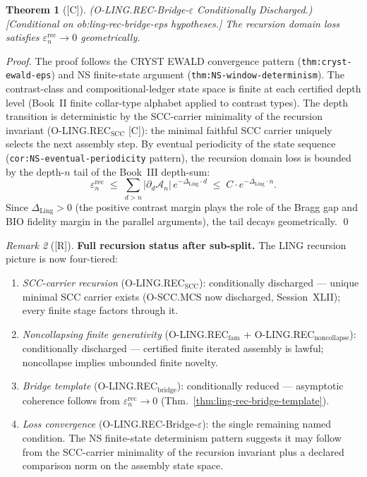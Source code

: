 \documentclass[12pt,oneside]{amsbook}
\theoremstyle{plain}
\newtheorem{theorem}{Theorem}[section]
\theoremstyle{definition}
\theoremstyle{remark}
\newtheorem{remark}[theorem]{Remark}
\newcommand{\status}[1]{\textup{[#1]}}
\begin{document}
\begin{theorem}[\status{C}]\label{thm:ling-rec-bridge-eps-discharged}
\textup{(O-LING.REC-Bridge-$\varepsilon$ Conditionally Discharged.)}
\textup{[Conditional on ob:ling-rec-bridge-eps hypotheses.]}
The recursion domain loss satisfies
$\varepsilon_n^{\mathrm{rec}} \to 0$ geometrically.
\end{theorem}

\begin{proof}
The proof follows the CRYST EWALD convergence pattern
(\texttt{thm:cryst-ewald-eps}) and NS finite-state argument
(\texttt{thm:NS-window-determinism}).
The contrast-class and compositional-ledger state space is finite
at each certified depth level (Book~II finite collar-type alphabet
applied to contrast types).  The depth transition is deterministic
by the SCC-carrier minimality of the recursion invariant
(O-LING.REC$_{\mathrm{SCC}}$ [C]): the minimal faithful SCC
carrier uniquely selects the next assembly step.  By eventual
periodicity of the state sequence (\texttt{cor:NS-eventual-periodicity}
pattern), the recursion domain loss is bounded by the depth-$n$
tail of the Book~III depth-sum:
\[
  \varepsilon_n^{\mathrm{rec}}
  \;\le\;
  \sum_{d > n} |\partial_d \mathcal{A}_n|\,
  e^{-\Delta_{\mathrm{Ling}} \cdot d}
  \;\le\;
  C \cdot e^{-\Delta_{\mathrm{Ling}} \cdot n}.
\]
Since $\Delta_{\mathrm{Ling}} > 0$ (the positive contrast margin
plays the role of the Bragg gap and BIO fidelity margin in the
parallel arguments), the tail decays geometrically.
\qed
\end{proof}

\begin{remark}[\status{R}]\label{rem:ling-REC-full-status}
\textbf{Full recursion status after sub-split.}
The LING recursion picture is now four-tiered:
\begin{enumerate}[label=\textup{(\alph*)}]
 \item \emph{SCC-carrier recursion} (O-LING.REC$_{\mathrm{SCC}}$):
 conditionally discharged --- unique minimal SCC carrier exists
 (O-SCC.MCS now discharged, Session~XLII); every finite stage
 factors through it.
 \item \emph{Noncollapsing finite generativity}
 (O-LING.REC$_{\mathrm{fam}}$ + O-LING.REC$_{\mathrm{noncollapse}}$):
 conditionally discharged --- certified finite iterated assembly
 is lawful; noncollapse implies unbounded finite novelty.
 \item \emph{Bridge template}
 (O-LING.REC$_{\mathrm{bridge}}$): conditionally reduced ---
 asymptotic coherence follows from $\varepsilon_n^{\mathrm{rec}}
 \to 0$ (Thm.~\ref{thm:ling-rec-bridge-template}).
 \item \emph{Loss convergence}
 (O-LING.REC-Bridge-$\varepsilon$): the single remaining
 named condition. The NS finite-state determinism pattern
 suggests it may follow from the SCC-carrier minimality of the
 recursion invariant plus a declared comparison norm on the
 assembly state space.
\end{enumerate}
\end{remark}
\end{document}
